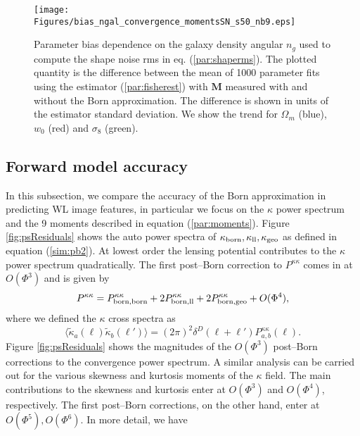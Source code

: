 \documentclass[reprint,aps,prd,superscriptaddress,showkeys,showpacs]{revtex4-1}
\newcommand{\bb}[1]{\mathbf{#1}}
\begin{document}
\begin{figure}
\begin{center}
\texttt{[image: Figures/bias\_ngal\_convergence\_momentsSN\_s50\_nb9.eps]}
\end{center}
\caption{Parameter bias dependence on the galaxy density angular $n_g$ used to compute the shape noise rms in eq. (\ref{par:shaperms}). The plotted quantity is the difference between the mean of 1000 parameter fits using the estimator (\ref{par:fisherest}) with $\bb{M}$ measured with and without the Born approximation. The difference is shown in units of the estimator standard deviation. We show the trend for $\Omega_m$ (blue), $w_0$ (red) and $\sigma_8$ (green).}
\label{fig:parbiasSN}
\end{figure}

\subsection{Forward model accuracy}

In this subsection, we compare the accuracy of the Born approximation in predicting WL image features, in particular we focus on the $\kappa$ power spectrum and the 9 moments described in equation (\ref{par:moments}). Figure \ref{fig:psResiduals} shows the auto power spectra of $\kappa_{\rm born},\kappa_{\rm ll},\kappa_{\rm geo}$ as defined in equation (\ref{sim:pb2}). At lowest order the lensing potential contributes to the $\kappa$ power spectrum quadratically. The first post--Born correction to $P^{\kappa\kappa}$ comes in at $O(\Phi^3)$ and is given by
\begin{equation}
\label{res:powercorr}
P^{\kappa\kappa} = P^{\kappa\kappa}_{\rm born,born} + 2P^{\kappa\kappa}_{\rm born,ll} + 2P^{\kappa\kappa}_{\rm born,geo} + O(\Phi^4),
\end{equation}
%
where we defined the $\kappa$ cross spectra as
\begin{equation}
\label{res:powercross}
\langle\tilde{\kappa}_a(\pmb{\ell})\tilde{\kappa}_b(\pmb{\ell}')\rangle = (2\pi)^2\delta^D(\pmb{\ell}+\pmb{\ell}')P_{a,b}^{\kappa\kappa}(\ell).
\end{equation} 
%
Figure \ref{fig:psResiduals} shows the magnitudes of the $O(\Phi^3)$ post--Born corrections to the convergence power spectrum. A similar analysis can be carried out for the various skewness and kurtosis moments of the $\kappa$ field. The main contributions to the skewness and kurtosis enter at $O(\Phi^3)$ and $O(\Phi^4)$, respectively. The first post--Born corrections, on the other hand, enter at $O(\Phi^5),O(\Phi^6)$. In more detail, we have
\end{document}
